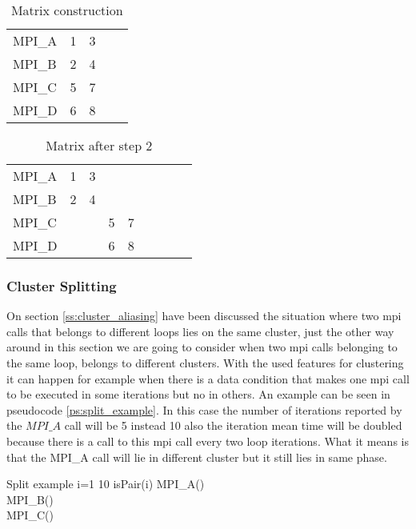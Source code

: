 \begin{table}[]
\centering
\caption{Matrix construction}
\label{tb:matrix_1}
\begin{tabular}{lllll}
MPI\_A & 1 & 3  \\
MPI\_B & 2 & 4  \\
MPI\_C & 5 & 7  \\
MPI\_D & 6 & 8 
\end{tabular}
\end{table}

\begin{table}[]
\centering
\caption{Matrix after step 2}
\label{tb:matrix_2}
\begin{tabular}{lllllllll}
MPI\_A & 1 & 3 &   &    \\
MPI\_B & 2 & 4 &   &    \\
MPI\_C &   &   & 5 & 7  \\
MPI\_D &   &   & 6 & 8 
\end{tabular}
\end{table}

\subsubsection{Cluster Splitting}\label{ss:cluster_split}

On section \ref{ss:cluster_aliasing} have been discussed the situation where two
mpi calls that belongs to different loops lies on the same cluster, just the
other way around in this section we are going to consider when two mpi calls
belonging to the same loop, belongs to different clusters. With the used
features for clustering it can happen for example when there is a data condition
that makes one mpi call to be executed in some iterations but no in others. An
example can be seen in pseudocode \ref{ps:split_example}. In this case the
number of iterations reported by the $MPI\_A$ call will be 5 instead 10 also the
iteration mean time will be doubled because there is a call to this mpi call
every two loop iterations. What it means is that the MPI\_A call will lie in
different cluster but it still lies in same phase.

\begin{pseudocode}{Split example}{ }
    \label{ps:split_example}
    \FOR i=1  10 \DO
    \BEGIN
        \IF isPair(i) \THEN
            MPI\_A() \\
        MPI\_B() \\
        MPI\_C() \\
    \END \\
\end{pseudocode}


